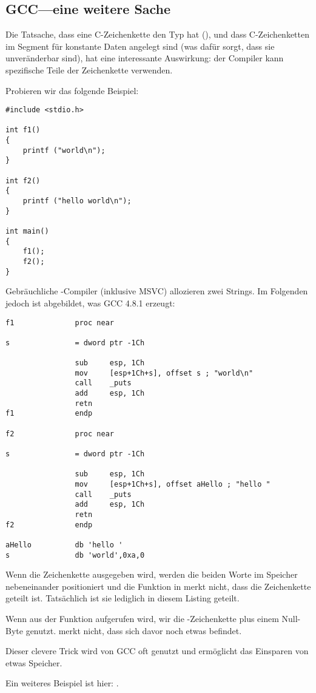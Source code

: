 \subsection{GCC---eine weitere Sache}
\label{use_parts_of_C_strings}

Die Tatsache, dass eine  C-Zeichenkette den Typ  hat (), 
und dass C-Zeichenketten im Segment für konstante Daten angelegt sind (was dafür sorgt, dass sie unveränderbar sind),
hat eine interessante Auswirkung: der Compiler kann spezifische Teile der Zeichenkette verwenden.

Probieren wir das folgende Beispiel:

\begin{lstlisting}[style=customc]
#include <stdio.h>

int f1()
{
	printf ("world\n");
}

int f2()
{
	printf ("hello world\n");
}

int main()
{
	f1();
	f2();
}
\end{lstlisting}

Gebräuchliche \CCpp{}-Compiler (inklusive MSVC) allozieren zwei Strings.
Im Folgenden jedoch ist abgebildet, was GCC 4.8.1 erzeugt:

\begin{lstlisting}[caption=GCC 4.8.1 + IDA,style=customasmx86]
f1              proc near

s               = dword ptr -1Ch

                sub     esp, 1Ch
                mov     [esp+1Ch+s], offset s ; "world\n"
                call    _puts
                add     esp, 1Ch
                retn
f1              endp

f2              proc near

s               = dword ptr -1Ch

                sub     esp, 1Ch
                mov     [esp+1Ch+s], offset aHello ; "hello "
                call    _puts
                add     esp, 1Ch
                retn
f2              endp

aHello          db 'hello '
s               db 'world',0xa,0
\end{lstlisting}

Wenn die Zeichenkette  ausgegeben wird, werden die beiden Worte im Speicher nebeneinander
positioniert und die Funktion \puts in  merkt nicht, dass die Zeichenkette geteilt ist.
Tatsächlich ist sie lediglich  in diesem Listing geteilt.

Wenn \puts aus der Funktion  aufgerufen wird, wir die -Zeichenkette plus einem Null-Byte
genutzt. \puts merkt nicht, dass sich davor noch etwas befindet.

Dieser clevere Trick wird von GCC oft genutzt und ermöglicht das Einsparen von etwas Speicher.

Ein weiteres Beispiel ist hier: .

